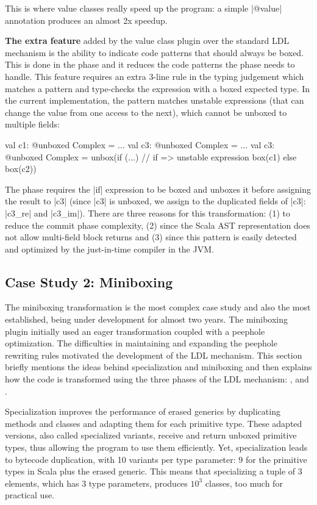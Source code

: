 This is where value classes really speed up the program: a simple |@value| annotation produces an almost 2x speedup.

\textbf{The extra feature} added by the value class plugin over the standard LDL mechanism is the ability to indicate code patterns that should always be boxed. This is done in the \coerce{} phase and it reduces the code patterns the \commit{} phase needs to handle. This feature requires an extra 3-line rule in the typing judgement which matches a pattern and type-checks the expression with a boxed expected type. In the current implementation, the pattern matches unstable expressions (that can change the value from one access to the next), which cannot be unboxed to multiple fields:

\begin{lstlisting-nobreak}
 val c1: @unboxed Complex = ...
 val c3: @unboxed Complex = ...
 val c3: @unboxed Complex =
   unbox(if (...) // if => unstable expression
             box(c1)
           else
             box(c2))
\end{lstlisting-nobreak}

The \coerce{} phase requires the |if| expression to be boxed and unboxes it before assigning the result to |c3| (since |c3| is unboxed, we assign to the duplicated fields of |c3|: |c3_re| and |c3_im|). There are three reasons for this transformation: (1) to reduce the commit phase complexity, (2) since the Scala AST representation does not allow multi-field block returns and (3) since this pattern is easily detected and optimized by the just-in-time compiler in the JVM.


\subsection{Case Study 2: Miniboxing}
\label{ldl:sec:validation/miniboxing}
The miniboxing transformation \cite{miniboxing, miniboxing-www} is the most complex case study and also the most established, being under development for almost two years. The miniboxing plugin initially used an eager transformation coupled with a peephole optimization. The difficulties in maintaining and expanding the peephole rewriting rules motivated the development of the LDL mechanism. This section briefly mentions the ideas behind specialization and miniboxing and then explains how the code is transformed using the three phases of the LDL mechanism: \inject{}, \coerce{} and \commit{}.

Specialization \cite{iuli-thesis} improves the performance of erased generics by duplicating methods and classes and adapting them for each primitive type. These adapted versions, also called specialized variants, receive and return unboxed primitive types, thus allowing the program to use them efficiently. Yet, specialization leads to bytecode duplication, with 10 variants per type parameter: $9$ for the primitive types in Scala plus the erased generic. This means that specializing a tuple of 3 elements, which has $3$ type parameters, produces $10^3$ classes, too much for practical use.


